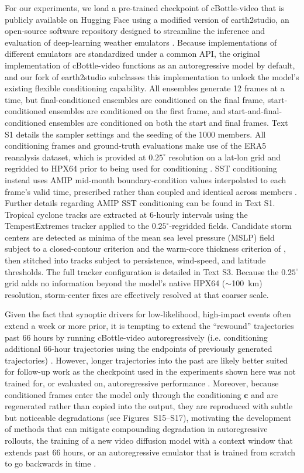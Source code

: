 \documentclass[final]{agujournal2019}
\begin{document}
For our experiments, we load a pre-trained checkpoint of cBottle-video that is publicly available on Hugging Face using a modified version of earth2studio, an open-source software repository designed to streamline the inference and evaluation of deep-learning weather emulators \cite{Earth2Studio_Contributors_NVIDIA_Earth2Studio_2024}. Because implementations of different emulators are standardized under a common API, the original implementation of cBottle-video functions as an autoregressive model by default, and our fork of earth2studio subclasses this implementation to unlock the model's existing flexible conditioning capability. All ensembles generate 12 frames at a time, but final-conditioned ensembles are conditioned on the final frame, start-conditioned ensembles are conditioned on the first frame, and start-and-final-conditioned ensembles are conditioned on both the start and final frames. Text S1 details the sampler settings and the seeding of the 1000 members. All conditioning frames and ground-truth evaluations make use of the ERA5 reanalysis dataset, which is provided at $0.25^{\circ}$ resolution on a lat-lon grid and regridded to HPX64 prior to being used for conditioning \cite{Hersbach2020-oh}. SST conditioning instead uses AMIP mid-month boundary-condition values interpolated to each frame's valid time, prescribed rather than coupled and identical across members \cite{Brenowitz2025-mz}. Further details regarding AMIP SST conditioning can be found in Text S1. Tropical cyclone tracks are extracted at 6-hourly intervals using the TempestExtremes tracker \cite{Ullrich2021-nm} applied to the $0.25^{\circ}$-regridded fields. Candidate storm centers are detected as minima of the mean sea level pressure (MSLP) field subject to a closed-contour criterion and the warm-core thickness criterion of , then stitched into tracks subject to persistence, wind-speed, and latitude thresholds. The full tracker configuration is detailed in Text S3. Because the $0.25^{\circ}$ grid adds no information beyond the model's native HPX64 ($\sim$100~km) resolution, storm-center fixes are effectively resolved at that coarser scale.

Given the fact that synoptic drivers for low-likelihood, high-impact events often extend a week or more prior, it is tempting to extend the ``rewound'' trajectories past 66 hours by running cBottle-video autoregressively (i.e. conditioning additional 66-hour trajectories using the endpoints of previously generated trajectories) \cite{White2023-fd}. However, longer trajectories into the past are likely better suited for follow-up work as the checkpoint used in the experiments shown here was not trained for, or evaluated on, autoregressive performance \cite{Brenowitz2025-mz}. Moreover, because conditioned frames enter the model only through the conditioning $\mathbf{c}$ and are regenerated rather than copied into the output, they are reproduced with subtle but noticeable degradations (see Figures~S15--S17), motivating the development of methods that can mitigate compounding degradation in autoregressive rollouts, the training of a new video diffusion model with a context window that extends past 66 hours, or an autoregressive emulator that is trained from scratch to go backwards in time \cite{Hassanzadeh2026-dd}.
\end{document}
